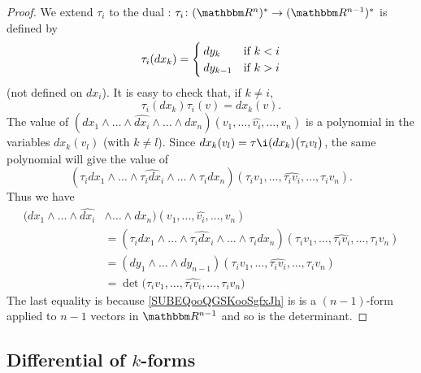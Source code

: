 \begin{proof}
    We extend \( \tau_i\) to the dual : \( \tau_i\colon(\eR^n)^*  \to (\eR^{n-1})^*\) is defined by
    \begin{equation}
        \tau_i(dx_k)=\begin{cases}
            dy_k    &   \text{if \( k<i\)}\\
            dy_{k-1}    &    \text{if \( k>i\)}
        \end{cases}
    \end{equation}
    (not defined on \( dx_i\)). It is easy to check that, if \( k\neq i\),
    \begin{equation}
        \tau_i(dx_k)\tau_i(v)=dx_k(v).
    \end{equation}
    The value of  $(dx_1\wedge\ldots\wedge\widehat{dx_i}\wedge\ldots\wedge dx_n)(v_1,\ldots, \widehat{v_i},\ldots, v_n)$ is a polynomial in the variables \( dx_k(v_l)\) (with \( k\neq l\)). Since \( dx_k(v_l)=\tau\i(dx_k)\big( \tau_iv_l \big)\), the same polynomial will give the value of
    \begin{equation}
        (\tau_idx_1\wedge\ldots\wedge \widehat{\tau_idx_i}\wedge\ldots\wedge \tau_idx_n  )(\tau_i v_1,\ldots, \widehat{\tau_iv_i},\ldots, \tau_iv_n).
    \end{equation}
    Thus we have
    \begin{subequations}
        \begin{align}
            (dx_1\wedge\ldots\wedge\widehat{dx_i}&\wedge\ldots\wedge dx_n)(v_1,\ldots, \widehat{v_i},\ldots, v_n)\\
            &=(\tau_idx_1\wedge\ldots\wedge \widehat{\tau_idx_i}\wedge\ldots\wedge \tau_idx_n  )(\tau_i v_1,\ldots, \widehat{\tau_iv_i},\ldots, \tau_iv_n)\\
            &=(dy_1\wedge\ldots\wedge dy_{n-1})(\tau_iv_1,\ldots,\widehat{\tau_iv_i},\ldots, \tau_iv_n) \label{SUBEQooQGSKooSgfxJh}\\
            &=\det\big( \tau_iv_1,\ldots, \widehat{\tau_i v_i},\ldots, \tau_iv_n \big)
        \end{align}
    \end{subequations}
    The last equality is because \eqref{SUBEQooQGSKooSgfxJh} is is a \( (n-1)\)-form applied to \( n-1\) vectors in \( \eR^{n-1}\) and so is the determinant. 
\end{proof}

\subsection{Differential of \texorpdfstring{$k$}{k}-forms}

